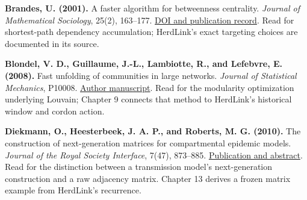 \documentclass[11pt,a4paper]{article}
\begin{document}
\textbf{Brandes, U. (2001).} A faster algorithm for betweenness
centrality. \emph{Journal of Mathematical Sociology}, 25(2), 163--177.
\href{https://doi.org/10.1080/0022250X.2001.9990249}{DOI and publication
record}. Read for shortest-path dependency accumulation; HerdLink's
exact targeting choices are documented in its source.

\textbf{Blondel, V. D., Guillaume, J.-L., Lambiotte, R., and Lefebvre,
E. (2008).} Fast unfolding of communities in large networks.
\emph{Journal of Statistical Mechanics}, P10008.
\href{https://arxiv.org/abs/0803.0476}{Author manuscript}. Read for the
modularity optimization underlying Louvain; Chapter 9 connects that
method to HerdLink's historical window and cordon action.

\textbf{Diekmann, O., Heesterbeek, J. A. P., and Roberts, M. G. (2010).}
The construction of next-generation matrices for compartmental epidemic
models. \emph{Journal of the Royal Society Interface}, 7(47), 873--885.
\href{https://pubmed.ncbi.nlm.nih.gov/19892718/}{Publication and
abstract}. Read for the distinction between a transmission model's
next-generation construction and a raw adjacency matrix. Chapter 13
derives a frozen matrix example from HerdLink's recurrence.
\end{document}
